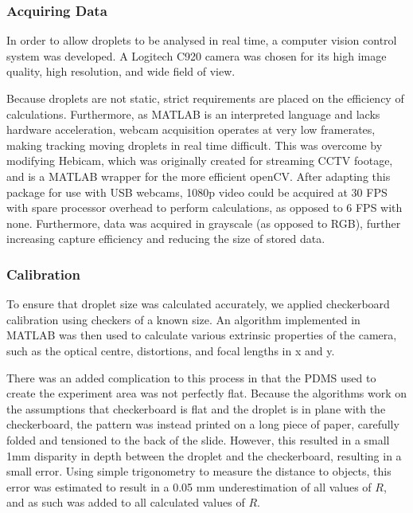 \documentclass{physics_article_B}
\begin{document}
        \subsubsection{Acquiring Data\label{sect:method:vision:acquire}}
            In order to allow droplets to be analysed in real time, a computer vision control system was developed. A Logitech C920 camera was chosen for its high image quality, high resolution, and wide field of view. 
            
            Because droplets are not static, strict requirements are placed on the efficiency of calculations. Furthermore, as MATLAB is an interpreted language and lacks hardware acceleration, webcam acquisition operates at very low framerates, making tracking moving droplets in real time difficult. This was overcome by modifying Hebicam\cite{HebiCam}, which was originally created for streaming CCTV footage, and is a MATLAB wrapper for the more efficient openCV. After adapting this package for use with USB webcams, 1080p video could be acquired at 30 FPS with spare processor overhead to perform calculations, as opposed to 6 FPS with none. Furthermore, data was acquired in grayscale (as opposed to RGB), further increasing capture efficiency and reducing the size of stored data. 
            
    
        \subsubsection{Calibration\label{sect:method:vision:calib}}

            To ensure that droplet size was calculated accurately, we applied checkerboard calibration using checkers of a known size. An algorithm implemented in MATLAB\cite{CameraCalibration} was then used to calculate various extrinsic properties of the camera, such as the optical centre, distortions, and focal lengths in x and y. 
        
            There was an added complication to this process in that the PDMS used to create the experiment area was not perfectly flat. Because the algorithms work on the assumptions that checkerboard is flat and the droplet is in plane with the checkerboard, the pattern was instead printed on a long piece of paper, carefully folded and tensioned to the back of the slide. However, this resulted in a small 1mm disparity in depth between the droplet and the checkerboard, resulting in a small error. Using simple trigonometry to measure the distance to objects, this error was estimated to result in a 0.05 mm underestimation of all values of $R$, and as such was added to all calculated values of $R$. 
            
\end{document}
